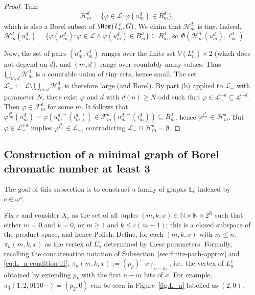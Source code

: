 \begin{proof}
    Take $$\mathcal H^d_m=\{\varphi\in\mathcal L:\varphi(u^d_m)\in B^d_m\},$$ which is also a Borel subset of $\Hom(L^c_n,G)$.
    We claim that $\mathcal H^d_m$ is tiny.
    Indeed, $\mathcal H^d_m(u^d_m)=\{\varphi(u^d_m):\varphi\in\mathcal L\land\varphi(u^d_m)\in B^d_m\}\subseteq B^d_m$, so $\Phi(\mathcal H^d_m(u^d_m),\ell^d_m)$.
    
    Now, the set of pairs $(u^d_m,i^d_m)$ ranges over the finite set $V(L^c_n)\times2$ (which does not depend on $d$), and $(m,d)$ range over countably many values.
    Thus $\bigcup_{m,d}\mathcal H^d_m$ is a countable union of tiny sets, hence small.
    The set $\mathcal L_-:=\mathcal L\setminus\bigcup_{m,d}\mathcal H^d_m$ is therefore large (and Borel).
    By part (b) applied to $\mathcal L_-$ with parameter $N$, there exist $\varphi$ and $d$ with $d(n)\geq N$ odd such that $\varphi\in\mathcal L_-^{+d}\subseteq\mathcal L^{+d}$.
    Then $\varphi\in\mathcal F^d_m$ for some $m$.
    It follows that $\varphi^{i^d_m}(u^d_m)=\varphi({u^d_m}^\smallfrown(i^d_m))\in\mathcal F^d_m({u^d_m}^\smallfrown(i^d_m))\subseteq B^d_m$, hence $\varphi^{i^d_m}\in\mathcal H^d_m$.
    But $\varphi\in\mathcal L_-^{+d}$ implies $\varphi^{i^d_m}\in\mathcal L_-$, contradicting $\mathcal L_-\cap\mathcal H^d_m=\emptyset$.
\end{proof}

\subsection{Construction of a minimal graph of Borel chromatic number at least 3}\label{sec:L0-construction}

The goal of this subsection is to construct a family of graphs $\mathbb L_c$ indexed by $c\in\omega^\omega$.

Fix $c$ and consider $X_c$ as the set of all tuples $(m,k,x)\in\mathbb N\times\mathbb N\times2^\mathbb N$ such that either $m=0$ and $k=0$, or $m\geq1$ and $k\leq c(m-1)$; this is a closed subspace of the product space, and hence Polish.
Define, for each $(m,k,x)$ with $m\leq n$, $\pi_n(m,k,x)$ as the vertex of $L^c_n$ determined by these parameters.
Formally, recalling the concatenation notation of Subsection~\ref{sec:finite-path-approx} and \eqref{eq:L_n-condition-iii}, $\pi_n(m,k,x):=(p_k)^\smallfrown x\restriction_{n-m}$, i.e.\ the vertex of $L^c_n$ obtained by extending $p_k$ with the first $n-m$ bits of $x$.
For example, $\pi_3(1,2,0110\cdots)=(p_2,0)$ can be seen in Figure~\ref{fig:L_n} labelled as $(2,0)$.

